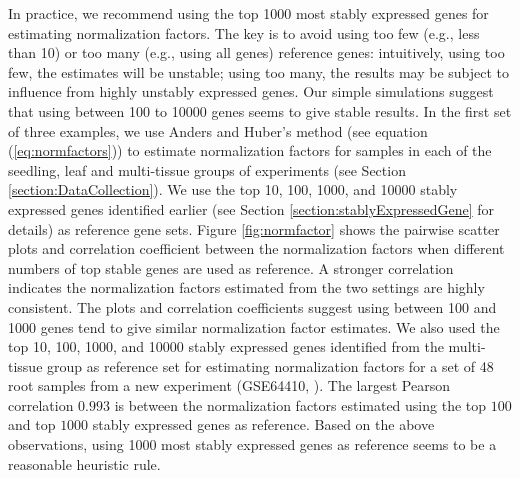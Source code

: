 				In practice, we recommend using the top 1000 most stably expressed genes for
				estimating normalization factors. The key is to avoid using too few (e.g.,
				less than 10) or too many (e.g., using all genes) reference genes:
				intuitively, using too few, the estimates will be unstable; using too many,
				the results may be subject to influence from highly unstably expressed genes.
				Our simple simulations suggest that using between 100 to 10000 genes seems to
				give stable results. In the first set of three examples, we use Anders and
				Huber's method (see equation (\ref{eq:normfactors})) to estimate normalization
				factors for samples in each of the seedling, leaf and multi-tissue groups of
				experiments (see Section \ref{section:DataCollection}).  We use the top 10,
				100, 1000, and 10000 stably expressed genes identified earlier (see Section
				\ref{section:stablyExpressedGene} for details) as reference gene sets. Figure
				\ref{fig:normfactor} shows the pairwise scatter plots and correlation
				coefficient between the normalization factors when different numbers of top
				stable genes are used as reference. A stronger correlation indicates the
				normalization factors estimated from the two settings are highly consistent.
				The plots and correlation coefficients suggest using between 100 and 1000
				genes tend to give similar normalization factor estimates. We also used the
				top 10, 100, 1000, and 10000 stably expressed genes identified from the
				multi-tissue group as reference set for estimating normalization factors for a set
				of 48 root samples from a new experiment (GSE64410, \cite{vragovic2015translatome}). The largest Pearson correlation
				$0.993$ is between the normalization factors estimated using the top $100$
				and top $1000$ stably expressed genes as reference. Based on the above
				observations, using 1000 most stably expressed genes as reference seems to be
				a reasonable heuristic rule.
				
				
				
				
